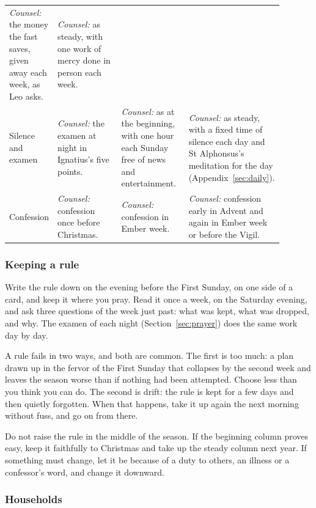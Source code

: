 {\begin{longtable}{@{}>{\raggedright\arraybackslash}p{0.14\linewidth}>{\raggedright\arraybackslash}p{0.25\linewidth}>{\raggedright\arraybackslash}p{0.25\linewidth}>{\raggedright\arraybackslash}p{0.25\linewidth}@{}}
\textit{Counsel:} the money the fast saves, given away each week, as Leo asks. &
\textit{Counsel:} as steady, with one work of mercy done in person each week.\\
\addlinespace
Silence and examen &
\textit{Counsel:} the examen at night in Ignatius's five points. &
\textit{Counsel:} as at the beginning, with one hour each Sunday free of news and entertainment. &
\textit{Counsel:} as steady, with a fixed time of silence each day and St Alphonsus's meditation
for the day (Appendix~\ref{sec:daily}).\\
\addlinespace
Confession &
\textit{Counsel:} confession once before Christmas. &
\textit{Counsel:} confession in Ember week. &
\textit{Counsel:} confession early in Advent and again in Ember week or before the Vigil.\\
\bottomrule
\end{longtable}
}

\subsubsection{Keeping a rule}

Write the rule down on the evening before the First Sunday, on one side of a card, and keep it
where you pray. Read it once a week, on the Saturday evening, and ask three questions of the week
just past: what was kept, what was dropped, and why. The examen of each night
(Section~\ref{sec:prayer}) does the same work day by day.

A rule fails in two ways, and both are common. The first is too much: a plan drawn up in the
fervor of the First Sunday that collapses by the second week and leaves the season worse than if
nothing had been attempted. Choose less than you think you can do. The second is drift: the rule is
kept for a few days and then quietly forgotten. When that happens, take it up again the next
morning without fuss, and go on from there.

Do not raise the rule in the middle of the season. If the beginning column proves easy, keep it
faithfully to Christmas and take up the steady column next year. If something must change, let it
be because of a duty to others, an illness or a confessor's word, and change it downward.

\subsubsection{Households}

